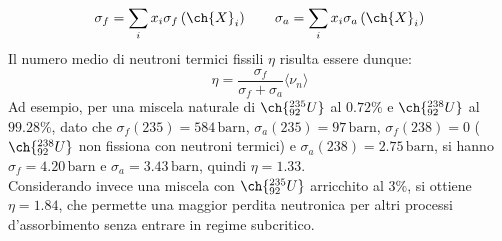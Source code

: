 \begin{equation}
	\sigma_f = \sum_{i} x_i \sigma_f\left( \ch{X}_i \right) \qquad \sigma_a = \sum_{i} x_i \sigma_a\left( \ch{X}_i \right)
	\label{eq:2.21}
\end{equation}
Il numero medio di neutroni termici fissili $ \eta $ risulta essere dunque:
\begin{equation}
	\eta = \frac{\sigma_f}{\sigma_f + \sigma_a} \langle \nu_n \rangle
	\label{eq:2.22}
\end{equation}
Ad esempio, per una miscela naturale di $ \ch{^{235}_{92} U} $ al $ 0.72\% $ e $ \ch{^{238}_{92} U} $ al $ 99.28\% $, dato che $ \sigma_f(235) = 584\,\text{barn} $, $ \sigma_a(235) = 97\,\text{barn} $, $ \sigma_f(238) = 0 $ ($ \ch{^{238}_{92} U} $ non fissiona con neutroni termici) e $ \sigma_a(238) = 2.75\,\text{barn} $, si hanno $ \sigma_f = 4.20\,\text{barn} $ e $ \sigma_{a} = 3.43\,\text{barn} $, quindi $ \eta = 1.33 $.\\
Considerando invece una miscela con $ \ch{^{235}_{92} U} $ arricchito al $ 3\% $, si ottiene $ \eta = 1.84 $, che permette una maggior perdita neutronica per altri processi d'assorbimento senza entrare in regime subcritico.










